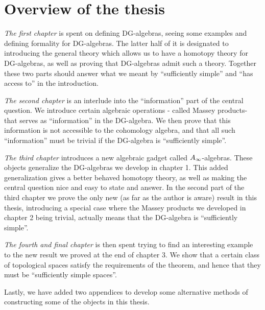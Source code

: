 

\section{Overview of the thesis}

\textit{The first chapter} is spent on defining DG-algebras, seeing some examples and  defining formality for DG-algebras. The latter half of it is designated to introducing the general theory which allows us to have a homotopy theory for DG-algebras, as well as proving that DG-algebras admit such a theory. Together these two parts should answer what we meant by ``sufficiently simple'' and ``has access to'' in the introduction.

\textit{The second chapter} is an interlude into the ``information'' part of the central question. We introduce certain algebraic operations - called Massey products- that serves as ``information'' in the DG-algebra. We then prove that this information is not accessible to the cohomology algebra, and that all such ``information'' must be trivial if the DG-algebra is ``sufficiently simple''. 

\textit{The third chapter} introduces a new algebraic gadget called $A_{\infty}$-algebras. These objects generalize the DG-algebras we develop in chapter 1. This added generalization gives a better behaved homotopy theory, as well as making the central question nice and easy to state and answer. In the second part of the third chapter we prove the only new (as far as the author is aware) result in this thesis, introducing a special case where the Massey products we developed in chapter 2 being trivial, actually means that the DG-algebra is ``sufficiently simple''. 

\textit{The fourth and final chapter} is then spent trying to find an interesting example to the new result we proved at the end of chapter 3. We show that a certain class of topological spaces satisfy the requirements of the theorem, and hence that they must be ``sufficiently simple spaces''. 

Lastly, we have added two appendices to develop some alternative methods of constructing some of the objects in this thesis. 


